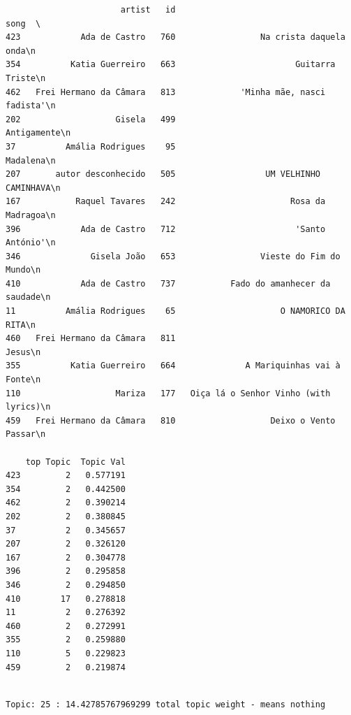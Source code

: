 \documentclass[11pt]{article}
\begin{document}
    
    \begin{verbatim}
                       artist   id                                     song  \
423            Ada de Castro   760                 Na crista daquela onda\n   
354          Katia Guerreiro   663                        Guitarra Triste\n   
462   Frei Hermano da Câmara   813             'Minha mãe, nasci fadista'\n   
202                   Gisela   499                            Antigamente\n   
37          Amália Rodrigues    95                               Madalena\n   
207       autor desconhecido   505                  UM VELHINHO CAMINHAVA\n   
167           Raquel Tavares   242                       Rosa da Madragoa\n   
396            Ada de Castro   712                        'Santo António'\n   
346              Gisela João   653                 Vieste do Fim do Mundo\n   
410            Ada de Castro   737           Fado do amanhecer da saudade\n   
11          Amália Rodrigues    65                     O NAMORICO DA RITA\n   
460   Frei Hermano da Câmara   811                                  Jesus\n   
355          Katia Guerreiro   664              A Mariquinhas vai à Fonte\n   
110                   Mariza   177   Oiça lá o Senhor Vinho (with lyrics)\n   
459   Frei Hermano da Câmara   810                   Deixo o Vento Passar\n   

    top Topic  Topic Val  
423         2   0.577191  
354         2   0.442500  
462         2   0.390214  
202         2   0.380845  
37          2   0.345657  
207         2   0.326120  
167         2   0.304778  
396         2   0.295858  
346         2   0.294850  
410        17   0.278818  
11          2   0.276392  
460         2   0.272991  
355         2   0.259880  
110         5   0.229823  
459         2   0.219874  
    \end{verbatim}

    
    \begin{Verbatim}[commandchars=\\\{\}]

Topic: 25 : 14.42785767969299 total topic weight - means nothing

    \end{Verbatim}
\end{document}
